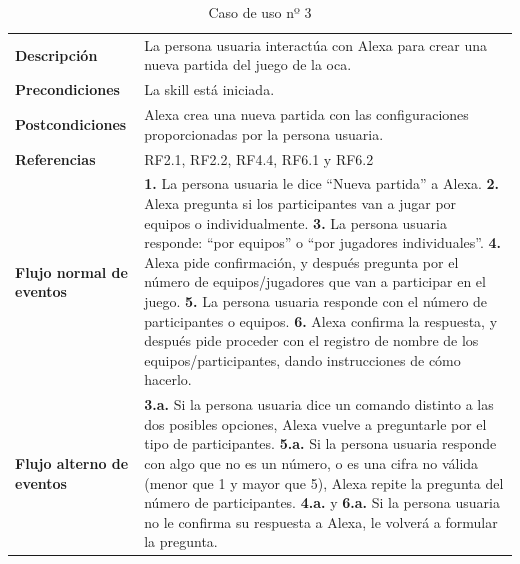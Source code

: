 \begin{table}[H]
	\centering
	\begin{tabular}{|p{3cm}|p{12cm}|}
		\hline
		\rowcolor{lightgray}
		\multicolumn{2}{|c|}{\textbf{CU03}: Crear una nueva partida} \\
		\hline
		\textbf{Descripción} & La persona usuaria interactúa con Alexa para crear una nueva partida del juego de la oca. \vspace{0.2cm} \\
		\hline
		\textbf{Precondiciones} & La skill está iniciada. \vspace{0.2cm} \\
		\hline
		\textbf{Postcondiciones} & Alexa crea una nueva partida con las configuraciones proporcionadas por la persona usuaria. \vspace{0.2cm} \\
		\hline
		\textbf{Referencias} & RF2.1, RF2.2, RF4.4, RF6.1 y RF6.2 \vspace{0.2cm} \\
		\hline
		\textbf{Flujo normal de eventos} &
		\textbf{1.} La persona usuaria le dice \enquote{Nueva partida} a Alexa. \newline
		\vspace{0.2cm}
		\textbf{2.} Alexa pregunta si los participantes van a jugar por equipos o individualmente. \newline
		\vspace{0.2cm}
		\textbf{3.} La persona usuaria responde: \enquote{por equipos} o \enquote{por jugadores individuales}. \newline
		\vspace{0.2cm} 
		\textbf{4.} Alexa pide confirmación, y después pregunta por el número de equipos/jugadores que van a participar en el juego. \newline
		\vspace{0.2cm}
		\textbf{5.} La persona usuaria responde con el número de participantes o equipos.\newline
		\vspace{0.2cm}
		\textbf{6.} Alexa confirma la respuesta, y después pide proceder con el registro de nombre de los equipos/participantes, dando instrucciones de cómo hacerlo.
		\vspace{0.2cm}\\
		\hline
		\textbf{Flujo alterno de eventos} &
		\textbf{3.a.} Si la persona usuaria dice un comando distinto a las dos posibles opciones, Alexa vuelve a preguntarle por el tipo de participantes. \vspace{0.2cm} \newline
		\textbf{5.a.} Si la persona usuaria responde con algo que no es un número, o es una cifra no válida (menor que 1 y mayor que 5), Alexa repite la pregunta del número de participantes. \vspace{0.2cm} \newline
		\textbf{4.a.} y \textbf{6.a.} Si la persona usuaria no le confirma su respuesta a Alexa, le volverá a formular la pregunta. \vspace{0.2cm}\\
		\hline
	\end{tabular}
	\caption{Caso de uso nº 3}
	\label{tab:CU03}
\end{table}

